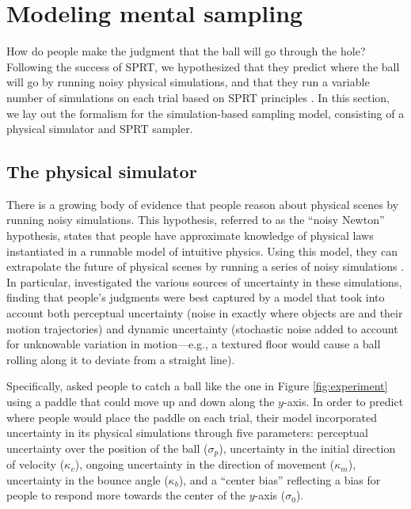 \documentclass[10pt,letterpaper]{article}
\begin{document}
\section{Modeling mental sampling}

How do people make the judgment that the ball will go through the hole?
Following the success of SPRT, we hypothesized that they predict where the ball will go by running noisy physical simulations, and that they run a variable number of simulations on each trial based on SPRT principles \cite{wald1947sequential}.
In this section, we lay out the formalism for the simulation-based sampling model, consisting of a physical simulator and SPRT sampler.

\subsection{The physical simulator}

There is a growing body of evidence that people reason about physical scenes by running noisy simulations.
This hypothesis, referred to as the ``noisy Newton'' hypothesis, states that people have approximate knowledge of physical laws instantiated in a runnable model of intuitive physics.
Using this model, they can extrapolate the future of physical scenes by running a series of noisy simulations \cite{Smith:2013fc,Battaglia2013,Smith:2013ug,Smith:2013th,Smith:2014tx,Ullman:2014ut,Hamrick:2015}.
In particular,  investigated the various sources of uncertainty in these simulations, finding that people's judgments were best captured by a model that took into account both perceptual uncertainty (noise in exactly where objects are and their motion trajectories) and dynamic uncertainty (stochastic noise added to account for unknowable variation in motion---e.g., a textured floor would cause a ball rolling along it to deviate from a straight line).

Specifically,  asked people to catch a ball like the one in Figure \ref{fig:experiment} using a paddle that could move up and down along the $y$-axis.
In order to predict where people would place the paddle on each trial, their model incorporated uncertainty in its physical simulations through five parameters: perceptual uncertainty over the position of the ball ($\sigma_p$), uncertainty in the initial direction of velocity ($\kappa_v$), ongoing uncertainty in the direction of movement ($\kappa_m$), uncertainty in the bounce angle ($\kappa_b$), and a ``center bias'' reflecting a bias for people to respond more towards the center of the $y$-axis ($\sigma_0$).
\end{document}
